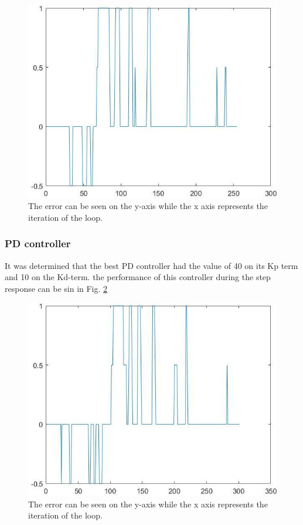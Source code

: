 \begin{figure}[h]
    \centering
    \includegraphics[width=\linewidth]{sections/assets/Kp40.jpg}
    \caption{The error can be seen on the y-axis while the x axis represents the iteration of the loop.}
    \label{Kp40}
\end{figure}

\subsubsection{PD controller}
It was determined that the best PD controller had the value of 40 on its Kp term and 10 on the Kd-term. the performance of this controller during the step response can be sin in Fig. \ref{Kp40_10Kd}

\begin{figure}[h]
    \centering
    \includegraphics[width=\linewidth]{sections/assets/Kp40_10Kd.jpg}
    \caption{The error can be seen on the y-axis while the x axis represents the iteration of the loop.}
    \label{Kp40_10Kd}
\end{figure}


